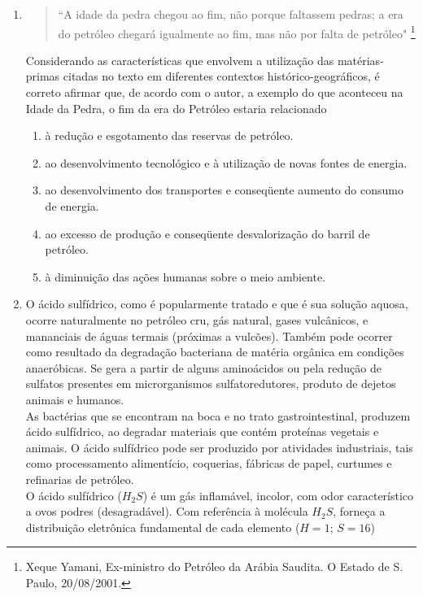 \documentclass[10pt,a4paper]{article}
\begin{document}
\begin{multicols}{2}
\begin{enumerate}
	\item \begin{quote}``A idade da pedra chegou ao fim, n\~ao porque faltassem pedras; a era do petr\'oleo chegar\'a igualmente ao fim, mas n\~ao por falta de petr\'oleo" \footnote{Xeque Yamani, Ex-ministro do Petr\'oleo da Ar\'abia Saudita. O Estado de S. Paulo, 20/08/2001.} \end{quote}
	Considerando as caracter\'isticas que envolvem a utiliza\c{c}\~ao das mat\'erias-primas citadas no texto em diferentes contextos hist\'orico-geogr\'aficos, \'e correto afirmar que, de acordo com o autor, a exemplo do que aconteceu na Idade da Pedra, o fim da era do Petr\'oleo estaria relacionado
		\begin{enumerate}
		\item \`a redu\c{c}\~ao e esgotamento das reservas de petr\'oleo. 
		\item ao desenvolvimento tecnol\'ogico e \`a utiliza\c{c}\~ao de novas fontes de energia. 
		\item ao desenvolvimento dos transportes e conseqüente aumento do consumo de energia. 
		\item ao excesso de produ\c{c}\~ao e conseqüente desvaloriza\c{c}\~ao do barril de petr\'oleo. 
		\item \`a diminui\c{c}\~ao das a\c{c}ões humanas sobre o meio ambiente. 
		\end{enumerate}

	\item O \'acido sulf\'idrico, como \'e popularmente tratado e que \'e sua solu\c{c}\~ao aquosa, ocorre naturalmente no petr\'oleo cru, g\'as natural, gases vulcânicos, e mananciais de \'aguas termais (pr\'oximas a vulc\~oes). Tamb\'em pode ocorrer como resultado da degrada\c{c}\~ao bacteriana de mat\'eria orgânica em condi\c{c}\~oes anaer\'obicas. Se gera a partir de alguns amino\'acidos ou pela redu\c{c}\~ao de sulfatos presentes em microrganismos sulfatoredutores, produto de dejetos animais e humanos. \\
	As bact\'erias que se encontram na boca e no trato gastrointestinal, produzem \'acido sulf\'idrico, ao degradar materiais que cont\'em prote\'inas vegetais e animais. O \'acido sulf\'idrico pode ser produzido por atividades industriais, tais como processamento aliment\'icio, coquerias, f\'abricas de papel, curtumes e refinarias de petr\'oleo.\\
	O \'acido sulf\'idrico ($H_2S$) \'e um g\'as inflam\'avel, incolor, com odor caracter\'istico a ovos podres (desagrad\'avel). Com refer\^encia \`a mol\'ecula $H_2S$, forne\c{c}a a distribui\c{c}\~ao eletr\^onica fundamental de cada elemento ($H=1$; $S=16$)


\end{enumerate}
\end{multicols}
\end{document}
